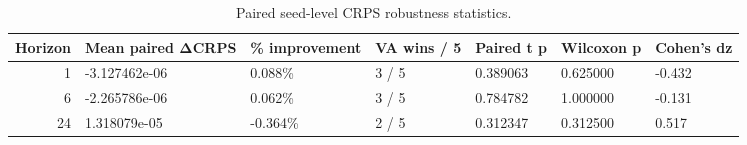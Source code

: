 \begin{table}
\caption{Paired seed-level CRPS robustness statistics.}
\label{tab:statistical-robustness}
\begin{tabular}{rllllll}
\toprule
Horizon & Mean paired ΔCRPS & \% improvement & VA wins / 5 & Paired t p & Wilcoxon p & Cohen's dz \\
\midrule
1 & -3.127462e-06 & 0.088\% & 3 / 5 & 0.389063 & 0.625000 & -0.432 \\
6 & -2.265786e-06 & 0.062\% & 3 / 5 & 0.784782 & 1.000000 & -0.131 \\
24 & 1.318079e-05 & -0.364\% & 2 / 5 & 0.312347 & 0.312500 & 0.517 \\
\bottomrule
\end{tabular}
\end{table}
